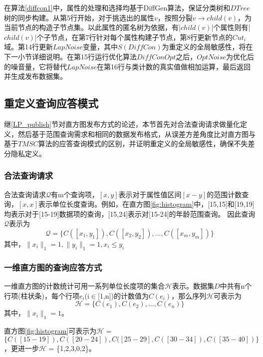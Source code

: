 在算法\ref{diffcon1}中，属性的处理和选择均基于DiffGen算法，保证分类树和$DTree$树的同步构建。从第5行开始，对于挑选出的属性$v$，按照分裂$v$$\rightarrow$$child(v)$，为当前节点的构造子节点集。以此属性的匿名树为依据，有|$child(v)$|个属性则有|$child(v)$|个子节点，在第7行针对每个属性构建子节点，第8行更新节点的$Cut_{i}$域。第14行更新$LapNoise$变量，其中$S(DiffCon)$为重定义的全局敏感性，将在下一小节详细说明。在第15行运行优化算法$DiffConOpt$之后，$OptNoise$为优化后的噪音量，它将替代$LapNoise$在第16行与类计数的真实值做相加运算，最后返回并生成发布数据集。

\subsection{重定义查询应答模式}

继\ref{LP_publish}节对直方图发布方式的论述，本节首先对合法查询请求做量化定义，然后基于范围查询需求和相同的数据发布格式，从误差方差角度比对直方图与基于$TMSC$算法的应答查询模式的区别，并证明重定义的全局敏感性，确保不失差分隐私定义。

\subsubsection{合法查询请求}

合法查询请求$\mathcal{Q}$有m个查询项，$[x,y]$表示对于属性值区间$[x-y]$的范围计数查询，$[x,x]$表示单位长度查询。例如，在直方图\ref{fig:histogram}中，[15,15]和[19,19]均表示对于[15-19]数据项的查询，[15,24]表示对[15-24]的年龄范围查询。
因此查询$\mathcal{Q}$表示为
\[
\mathcal{Q} = \{C([x_{1},y_{1}]),C([x_{2},y_{2}]),...,C([x_{m},y_{m}])\}
\]
其中，$\|x_{i}\|_{1} = 1, \|y_{i}\|_{1} = 1, x_{i} \leqslant y_{i}$

\subsubsection{一维直方图的查询应答方式}

一维直方图的计数统计可用一系列单位长度项的集合$\mathcal{H}$表示。数据集$D$中共有n个行项(柱状条)，每个行项$e_{i}$(i$\in$[1,n])的计数值为$C(e_{i})$，那么序列$\mathcal{H}$可表示为
\begin{equation*}
	\mathcal{H} = \{C(e_{1}),C(e_{2}),...,C(e_{n})\}
\end{equation*}
其中，$\|x_{i}\|_{1} = 1$。

\begin{exmp}
	\label{chap4_exmp}
	直方图\ref{fig:histogram}可表示为$\mathcal{H}$ = $\{C([15-19]),C([20-24]),C([25-29],C([30-34]),C([35-40])\}$，更进一步$\mathcal{H}$ = \{1,2,3,0,2\}。
\end{exmp}

